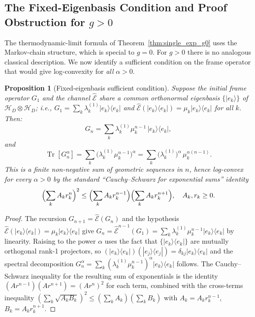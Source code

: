 \documentclass[12pt,a4paper]{article}
\newtheorem{proposition}[theorem]{Proposition}
\begin{document}
\subsection{The Fixed-Eigenbasis Condition and Proof Obstruction for $g>0$}
\label{sec:fixed_eigenbasis}

The thermodynamic-limit formula of Theorem~\ref{thm:single_exp_g0} uses the
Markov-chain structure, which is special to $g=0$.  For $g>0$ there is no
analogous classical description.  We now identify a sufficient condition on
the frame operator that would give log-convexity for \emph{all} $\alpha>0$.

\begin{proposition}[Fixed-eigenbasis sufficient condition]
\label{prop:fixed_eigenbasis}
Suppose the initial frame operator $G_1$ and the channel $\hat{\mathcal{E}}$
share a common orthonormal eigenbasis $\{|e_k\rangle\}$ of $\mathcal{H}_D\otimes\mathcal{H}_D$;
i.e., $G_1=\sum_k\lambda_k^{(1)}|e_k\rangle\langle e_k|$ and
$\hat{\mathcal{E}}(|e_k\rangle\langle e_k|)=\mu_k|e_k\rangle\langle e_k|$ for all $k$.
Then:
\[
  G_n = \sum_k \lambda_k^{(1)}\mu_k^{n-1}\,|e_k\rangle\langle e_k|,
\]
and
\[
  \operatorname{Tr}[G_n^\alpha]
  = \sum_k \bigl(\lambda_k^{(1)}\mu_k^{n-1}\bigr)^\alpha
  = \sum_k \bigl(\lambda_k^{(1)}\bigr)^\alpha\,\mu_k^{\alpha(n-1)}.
\]
This is a finite non-negative sum of geometric sequences in $n$,
hence log-convex for every $\alpha>0$ by the standard
``Cauchy--Schwarz for exponential sums'' identity
\[
  \Bigl(\sum_k A_k r_k^n\Bigr)^2 \leq \Bigl(\sum_k A_k r_k^{n-1}\Bigr)
  \Bigl(\sum_k A_k r_k^{n+1}\Bigr), \quad A_k,r_k\geq 0.
\]
\end{proposition}

\begin{proof}
The recursion $G_{n+1}=\hat{\mathcal{E}}(G_n)$ and the hypothesis $\hat{\mathcal{E}}(|e_k\rangle\langle e_k|)=\mu_k|e_k\rangle\langle e_k|$ give $G_n=\hat{\mathcal{E}}^{n-1}(G_1)=\sum_k\lambda_k^{(1)}\mu_k^{n-1}|e_k\rangle\langle e_k|$ by linearity.  Raising to the power $\alpha$ uses the fact that $\{|e_k\rangle\langle e_k|\}$ are mutually orthogonal rank-1 projectors, so $(|e_k\rangle\langle e_k|)(|e_j\rangle\langle e_j|)=\delta_{kj}|e_k\rangle\langle e_k|$ and the spectral decomposition
$G_n^\alpha=\sum_k(\lambda_k^{(1)}\mu_k^{n-1})^\alpha|e_k\rangle\langle e_k|$
follows.  The Cauchy--Schwarz inequality for the resulting sum of exponentials
is the identity $(Ar^{n-1})(Ar^{n+1})=(Ar^n)^2$ for each term, combined with the
cross-terms inequality $(\sum_k\sqrt{A_k B_k})^2\leq(\sum_k A_k)(\sum_k B_k)$ with
$A_k=A_k r_k^{n-1}$, $B_k=A_k r_k^{n+1}$.
\end{proof}
\end{document}
